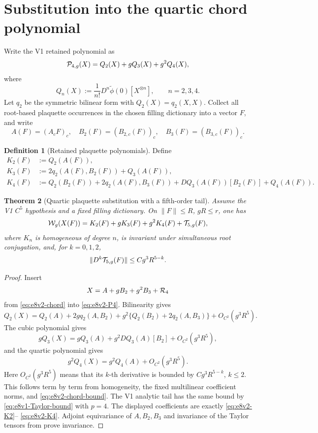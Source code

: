 \documentclass[11pt,oneside]{book}
\newtheorem{theorem}{Theorem}[chapter]
\theoremstyle{definition}
\newtheorem{definition}[theorem]{Definition}
\theoremstyle{remark}
\begin{document}
\section{Substitution into the quartic chord polynomial}
\label{sec:e8v2-substitution}

Write the V1 retained polynomial as
\[
 {\cal P}_{4,g}(X)
 =
 Q_2(X)+gQ_3(X)+g^2Q_4(X),                           \label{eq:e8v2-P4}
\]
where
\[
 Q_n(X):=\frac1{n!}D^n\widetilde\phi(0)
 [X^{\otimes n}],\qquad n=2,3,4.                    \label{eq:e8v2-Qn}
\]
Let \(q_2\) be the symmetric bilinear form with
\(Q_2(X)=q_2(X,X)\).  Collect all root-based plaquette occurrences in
the chosen filling dictionary into a vector \(F\), and write
\[
 A(F)=(A_cF)_c,\quad
 B_2(F)=(B_{2,c}(F))_c,\quad
 B_3(F)=(B_{3,c}(F))_c.                              \label{eq:e8v2-ABC}
\]

\begin{definition}[Retained plaquette polynomials]
\label{def:e8v2-K}
Define
\begin{align}
 K_2(F)
 &:=
 Q_2(A(F)),                                          \label{eq:e8v2-K2}\\
 K_3(F)
 &:=
 2q_2(A(F),B_2(F))+Q_3(A(F)),                        \label{eq:e8v2-K3}\\
 K_4(F)
 &:=
 Q_2(B_2(F))
 +2q_2(A(F),B_3(F))
 +DQ_3(A(F))[B_2(F)]
 +Q_4(A(F)).                                         \label{eq:e8v2-K4}
\end{align}
\end{definition}

\begin{theorem}[Quartic plaquette substitution with a fifth-order
tail]
\label{thm:e8v2-substitution}
Assume the V1 \(C^5\) hypothesis and a fixed filling dictionary.
On \(\|F\|\leq R\), \(gR\leq r\), one has
\[
 {\cal W}_g(X(F))
 =
 K_2(F)+gK_3(F)+g^2K_4(F)+{\cal T}_{5,g}(F),         \label{eq:e8v2-substitution}
\]
where \(K_n\) is homogeneous of degree \(n\), is invariant under
simultaneous root conjugation, and, for \(k=0,1,2\),
\[
 \|D^k{\cal T}_{5,g}(F)\|
 \leq Cg^3R^{5-k}.                                   \label{eq:e8v2-T-bound}
\]
\end{theorem}

\begin{proof}
Insert
\[
 X=A+gB_2+g^2B_3+{\cal R}_4
\]
from \eqref{eq:e8v2-chord} into
\eqref{eq:e8v2-P4}.  Bilinearity gives
\[
 Q_2(X)
 =
 Q_2(A)+2gq_2(A,B_2)
 +g^2\{Q_2(B_2)+2q_2(A,B_3)\}
 +O_{C^2}(g^3R^5).
\]
The cubic polynomial gives
\[
 gQ_3(X)
 =
 gQ_3(A)+g^2DQ_3(A)[B_2]
 +O_{C^2}(g^3R^5),
\]
and the quartic polynomial gives
\[
 g^2Q_4(X)=g^2Q_4(A)+O_{C^2}(g^3R^5).
\]
Here \(O_{C^2}(g^3R^5)\) means that its \(k\)-th derivative is
bounded by \(Cg^3R^{5-k}\), \(k\leq2\).  This follows term by term
from homogeneity, the fixed multilinear coefficient norms, and
\eqref{eq:e8v2-chord-bound}.  The V1 analytic tail has the same bound
by \eqref{eq:e8v1-Taylor-bound} with \(p=4\).  The displayed
coefficients are exactly \eqref{eq:e8v2-K2}--
\eqref{eq:e8v2-K4}.  Adjoint equivariance of \(A,B_2,B_3\) and
invariance of the Taylor tensors from
 prove invariance.
\end{proof}
\end{document}
